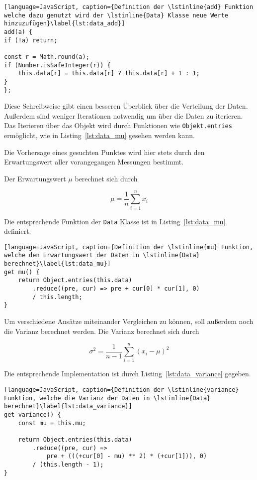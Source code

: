 \begin{lstlisting}[language=JavaScript, caption={Definition der \lstinline{add} Funktion welche dazu genutzt wird der \lstinline{Data} Klasse neue Werte hinzuzufügen}\label{lst:data_add}]
add(a) {
if (!a) return;

const r = Math.round(a);
if (Number.isSafeInteger(r)) {
    this.data[r] = this.data[r] ? this.data[r] + 1 : 1;
}
};
\end{lstlisting}

Diese Schreibweise gibt einen besseren Überblick über die Verteilung der Daten.
Außerdem sind weniger Iterationen notwendig um über die Daten zu iterieren.
Das Iterieren über das Objekt wird durch Funktionen wie \lstinline{Objekt.entries} ermöglicht, wie in Listing~\ref{lst:data_mu} gesehen werden kann.

Die Vorhersage eines gesuchten Punktes wird hier stets durch den Erwartungswert aller vorangegangen Messungen bestimmt.

Der Erwartungswert $\mu$ berechnet sich durch

\begin{equation}
    \mu = \frac{1}{n} \sum_{i=1}^n{x_i}
\end{equation}

Die entsprechende Funktion der \lstinline{Data} Klasse ist in Listing~\ref{lst:data_mu} definiert.

\begin{lstlisting}[language=JavaScript, caption={Definition der \lstinline{mu} Funktion, welche den Erwartungswert der Daten in \lstinline{Data} berechnet}\label{lst:data_mu}]
get mu() {
    return Object.entries(this.data)
        .reduce((pre, cur) => pre + cur[0] * cur[1], 0)
        / this.length;
}
\end{lstlisting}

Um verschiedene Ansätze miteinander Vergleichen zu können, soll außerdem noch die Varianz berechnet werden.
Die Varianz berechnet sich durch

\begin{equation}
    \sigma^2 = \frac{1}{n - 1} \sum_{i=1}^n(x_i - \mu)^2
\end{equation}

Die entsprechende Implementation ist durch Listing~\ref{lst:data_variance} gegeben.

\begin{lstlisting}[language=JavaScript, caption={Definition der \lstinline{variance} Funktion, welche die Varianz der Daten in \lstinline{Data} berechnet}\label{lst:data_variance}]
get variance() {
    const mu = this.mu;

    return Object.entries(this.data)
        .reduce((pre, cur) =>
            pre + (((+cur[0] - mu) ** 2) * (+cur[1])), 0)
        / (this.length - 1);
}
\end{lstlisting}

